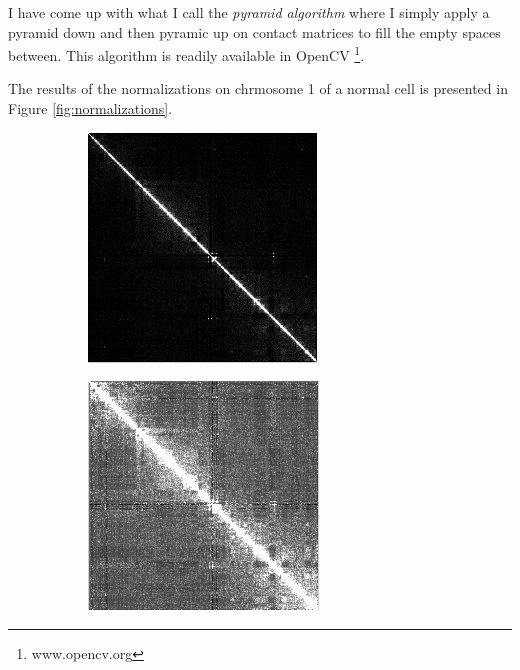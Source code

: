 \documentclass{article}
\begin{document}
I have come up with what I call the \textit{pyramid algorithm}
where I simply apply a pyramid down and then pyramic up
on contact matrices to fill the empty spaces between. 
This algorithm is readily available
in OpenCV \footnote{www.opencv.org}.

The results of the normalizations on chrmosome 1 of a normal
cell is presented in Figure \ref{fig:normalizations}.

\begin{figure}[H]
    \centering
    \begin{subfigure}[b]{.3\textwidth}
        \includegraphics[width=\textwidth]{figures/original_cleaned.png}
        \caption{}
        \label{fig:original_cleaned}
    \end{subfigure}
    \begin{subfigure}[b]{.3\textwidth}
        \includegraphics[width=\textwidth]{figures/pearson.png}

\end{subfigure}
\end{figure}
\end{document}
